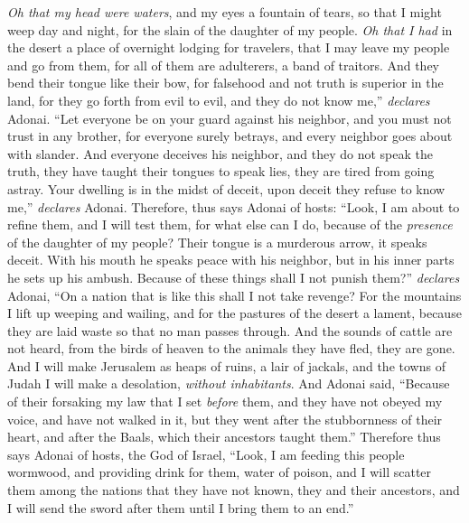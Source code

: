 \begin{biblechapter} %
\verse  \textit{Oh that my head were waters}, 
and my eyes a fountain of tears, 
so that I might weep day and night, 
for the slain of the daughter of my people.
\verse \textit{Oh that I had} in the desert a place of overnight lodging for travelers, 
that I may leave my people and go from them, 
for all of them are adulterers, 
a band of traitors.
\verse And they bend their tongue like their bow, 
for falsehood and not truth is superior in the land, 
for they go forth from evil to evil, 
and they do not know me,” \textit{declares} Adonai.
 “Let everyone be on your guard against his neighbor, 
and you must not trust in any brother, 
for everyone surely betrays, 
and every neighbor goes about with slander.
\verse And everyone deceives his neighbor, 
and they do not speak the truth, 
they have taught their tongues to speak lies, 
they are tired from going astray.
\verse Your dwelling is in the midst of deceit, 
upon deceit they refuse to know me,” \textit{declares} Adonai.
\verse Therefore, thus says Adonai of hosts:
\verse “Look, I am about to refine them, 
and I will test them, 
for what else can I do, 
because of the \textit{presence} of the daughter of my people?
\verse Their tongue is a murderous arrow, 
it speaks deceit. 
With his mouth he speaks peace with his neighbor, 
but in his inner parts he sets up his ambush.
\verse Because of these things shall I not punish them?” \textit{declares} Adonai, 
“On a nation that is like this shall I not take revenge?
\verse For the mountains I lift up weeping and wailing, 
and for the pastures of the desert a lament, 
because they are laid waste so that no man passes through. 
And the sounds of cattle are not heard, 
from the birds of heaven to the animals 
they have fled, they are gone.
\verse And I will make Jerusalem as heaps of ruins, a lair of jackals, 
and the towns of Judah I will make a desolation, \textit{without inhabitants}.
 And Adonai said, “Because of their forsaking my law that I set \textit{before} them, and they have not obeyed my voice, and have not walked in it,
\verse but they went after the stubbornness of their heart, and after the Baals, which their ancestors taught them.”
\verse Therefore thus says Adonai of hosts, the God of Israel, “Look, I am feeding this people wormwood, and providing drink for them, water of poison,
\verse and I will scatter them among the nations that they have not known, they and their ancestors, and I will send the sword after them until I bring them to an end.”

\end{biblechapter}
